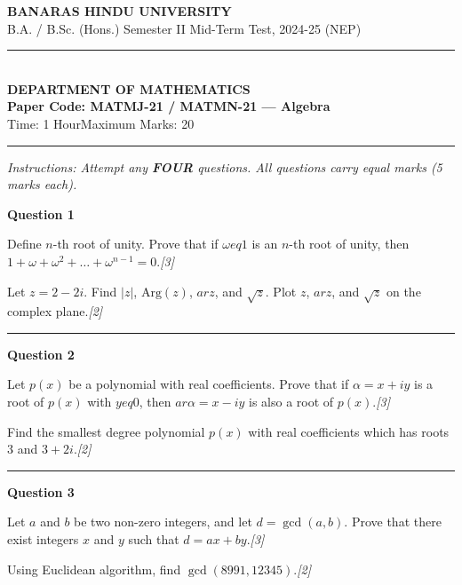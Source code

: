 \documentclass[11pt,a4paper]{article}
\newcommand{\pts}[1]{\hfill   \textit{[#1]}}
\begin{document}
\begin{center}
  {\large\bfseries BANARAS HINDU UNIVERSITY}\\[2pt]
  {\normalsize B.A. / B.Sc. (Hons.) Semester II Mid-Term Test, 2024-25 (NEP)}\\[6pt]
  \rule{0.8\linewidth}{0.5pt}\\[6pt]
  {\large\bfseries DEPARTMENT OF MATHEMATICS}\\[4pt]
  {\large\bfseries Paper Code: MATMJ-21 / MATMN-21 --- Algebra}\\[4pt]
  {\normalsize Time: 1 Hour\hfill Maximum Marks: 20}
\end{center}

\rule{\linewidth}{0.4pt}\smallskip



\noindent   \textit{Instructions: Attempt any   \textbf{FOUR} questions. All questions carry equal marks (5 marks each).}
\bigskip




\noindent   \textbf{Question 1}

\begin{parts}
  \item Define $n$-th root of unity. Prove that if $\omega 
eq 1$ is an $n$-th root of unity, then $1 + \omega + \omega^2 + \dots + \omega^{n-1} = 0$.\pts{3}
  \item Let $z = 2 - 2i$. Find $|z|$, $ \text{Arg}(z)$, $ar{z}$, and $\sqrt{z}$. Plot $z$, $ar{z}$, and $\sqrt{z}$ on the complex plane.\pts{2}
\end{parts}

\medskip\rule{\linewidth}{0.2pt}\medskip




\noindent   \textbf{Question 2}

\begin{parts}
  \item Let $p(x)$ be a polynomial with real coefficients. Prove that if $\alpha = x + iy$ is a root of $p(x)$ with $y 
eq 0$, then $ar{\alpha} = x - iy$ is also a root of $p(x)$.\pts{3}
  \item Find the smallest degree polynomial $p(x)$ with real coefficients which has roots $3$ and $3 + 2i$.\pts{2}
\end{parts}

\medskip\rule{\linewidth}{0.2pt}\medskip




\noindent   \textbf{Question 3}

\begin{parts}
  \item Let $a$ and $b$ be two non-zero integers, and let $d = \gcd(a, b)$. Prove that there exist integers $x$ and $y$ such that $d = ax + by$.\pts{3}
  \item Using Euclidean algorithm, find $\gcd(8991, 12345)$.\pts{2}
\end{parts}
\end{document}
